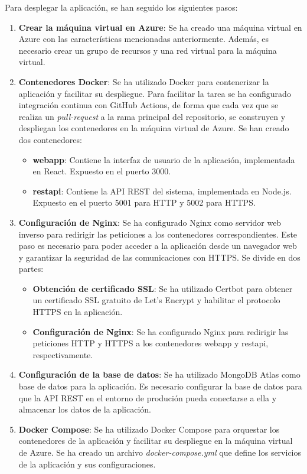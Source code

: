 Para desplegar la aplicación, se han seguido los siguientes pasos:
\begin{enumerate}
    \item \textbf{Crear la máquina virtual en Azure}: Se ha creado una máquina virtual en Azure con las características mencionadas anteriormente. 
    Además, es necesario crear un grupo de recursos y una red virtual para la máquina virtual.

    \item \textbf{Contenedores Docker}: Se ha utilizado Docker para contenerizar la aplicación y facilitar su despliegue. 
    Para facilitar la tarea se ha configurado integración continua con GitHub Actions, de forma que cada vez que se realiza un \textit{pull-request} a la rama principal del repositorio, se construyen y despliegan los contenedores en la máquina virtual de Azure.
    Se han creado dos contenedores:
    \begin{itemize}
        \item \textbf{webapp}: Contiene la interfaz de usuario de la aplicación, implementada en React. Expuesto en el puerto 3000.
        \item \textbf{restapi}: Contiene la API REST del sistema, implementada en Node.js. Expuesto en el puerto 5001 para HTTP y 5002 para HTTPS.
    \end{itemize}

    \item \textbf{Configuración de Nginx}: Se ha configurado Nginx como servidor web inverso para redirigir las peticiones a los contenedores correspondientes.
    Este paso es necesario para poder acceder a la aplicación desde un navegador web y garantizar la seguridad de las comunicaciones con HTTPS.
    Se divide en dos partes:
    \begin{itemize}
        \item \textbf{Obtención de certificado SSL}: Se ha utilizado Certbot para obtener un certificado SSL gratuito de Let's Encrypt y habilitar el protocolo HTTPS en la aplicación.
        \item \textbf{Configuración de Nginx}: Se ha configurado Nginx para redirigir las peticiones HTTP y HTTPS a los contenedores webapp y restapi, respectivamente.
    \end{itemize}

    \item \textbf{Configuración de la base de datos}: Se ha utilizado MongoDB Atlas como base de datos para la aplicación. 
    Es necesario configurar la base de datos para que la API REST en el entorno de produción pueda conectarse a ella y almacenar los datos de la aplicación.

    \item \textbf{Docker Compose}: Se ha utilizado Docker Compose para orquestar los contenedores de la aplicación y facilitar su despliegue en la máquina virtual de Azure.
    Se ha creado un archivo \textit{docker-compose.yml} que define los servicios de la aplicación y sus configuraciones.

\end{enumerate}

